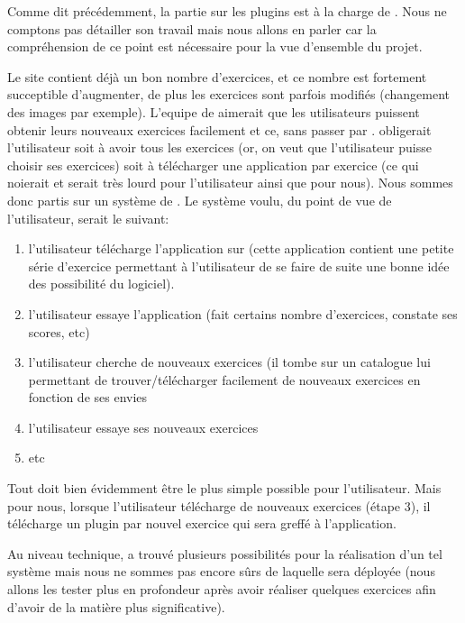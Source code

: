 Comme dit précédemment, la partie sur les plugins est à la charge de \etudiantSL{}. Nous ne comptons pas détailler son travail mais nous allons en parler car la compréhension de ce point est nécessaire pour la vue d'ensemble du projet.

Le site \pepit{} contient déjà un bon nombre d'exercices, et ce nombre est fortement succeptible d'augmenter, de plus les exercices sont parfois modifiés (changement des images par exemple). L'equipe de \pepit{} aimerait que les utilisateurs puissent obtenir leurs nouveaux exercices facilement et ce, sans passer par \market{}. \market{} obligerait l'utilisateur soit à avoir tous les exercices (or, on veut que l'utilisateur puisse choisir ses exercices) soit à télécharger une application par exercice (ce qui noierait \market{} et serait très lourd pour l'utilisateur ainsi que pour nous).
\newline
Nous sommes donc partis sur un système de \plugins{}. Le système voulu, du point de vue de l'utilisateur, serait le suivant:
\begin{enumerate}
	\item l'utilisateur télécharge l'application sur \market{} (cette application contient une petite série d'exercice permettant à l'utilisateur de se faire de suite une bonne idée des possibilité du logiciel).
	\item l'utilisateur essaye l'application (fait certains nombre d'exercices, constate ses scores, etc)
	\item l'utilisateur cherche de nouveaux exercices (il tombe sur un catalogue lui permettant de trouver/télécharger facilement de nouveaux exercices en fonction de ses envies
	\item l'utilisateur essaye ses nouveaux exercices
	\item etc
\end{enumerate}
Tout doit bien évidemment être le plus simple possible pour l'utilisateur. Mais pour nous, lorsque l'utilisateur télécharge de nouveaux exercices (étape 3), il télécharge un plugin par nouvel exercice qui sera greffé à l'application. 

Au niveau technique, \etudiantSL{} a trouvé plusieurs possibilités pour la réalisation d'un tel système mais nous ne sommes pas encore sûrs de laquelle sera déployée (nous allons les tester plus en profondeur après avoir réaliser quelques exercices afin d'avoir de la matière plus significative).
